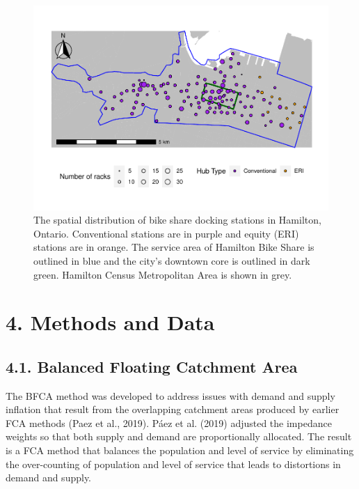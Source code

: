 \documentclass[]{elsarticle} %
\begin{document}
\begin{figure}

{\centering \includegraphics[width=1\linewidth]{Bike-share-spatial-equity_files/figure-latex/sobi-stations-in-hamilton-1} 

}

\caption{The spatial distribution of bike share docking stations in Hamilton, Ontario. Conventional stations are in purple and equity (ERI) stations are in orange. The service area of Hamilton Bike Share is outlined in blue and the city's downtown core is outlined in dark green. Hamilton Census Metropolitan Area is shown in grey.}\label{fig:sobi-stations-in-hamilton}
\end{figure}

\hypertarget{sec:methods}{%
\section{4. Methods and Data}\label{sec:methods}}

\hypertarget{balanced-floating-catchment-area}{%
\subsection{4.1. Balanced Floating Catchment
Area}\label{balanced-floating-catchment-area}}

The BFCA method was developed to address issues with demand and supply
inflation that result from the overlapping catchment areas produced by
earlier FCA methods (Paez et al., 2019). Páez et al. (2019) adjusted the
impedance weights so that both supply and demand are proportionally
allocated. The result is a FCA method that balances the population and
level of service by eliminating the over-counting of population and
level of service that leads to distortions in demand and supply.
\end{document}
